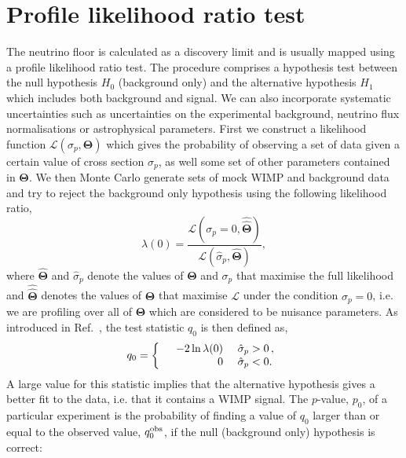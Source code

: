 \chapter{Profile likelihood ratio test}\label{app:likelihood}
The neutrino floor is calculated as a discovery limit and is usually mapped using a profile likelihood ratio test. The procedure comprises a hypothesis test between the null hypothesis $H_0$ (background only) and the alternative hypothesis $H_1$ which includes both background and signal. We can also incorporate systematic uncertainties such as uncertainties on the experimental background, neutrino flux normalisations or astrophysical parameters. First we construct a likelihood function $\mathscr{L}(\sigma_p,\boldsymbol{\Theta})$ which gives the probability of observing a set of data given a certain value of cross section $\sigma_p$, as well some set of other parameters contained in $\boldsymbol{\Theta}$. We then Monte Carlo generate sets of mock WIMP and background data and try to reject the background only hypothesis using the following likelihood ratio,
\begin{equation}
\lambda(0) = \frac{\mathscr{L}(\sigma_p = 0,\hat{\hat{\boldsymbol{\Theta}}})}{\mathscr{L}(\hat{\sigma}_p,\hat{\boldsymbol{\Theta}})},
\end{equation}
where ${\hat{\boldsymbol{\Theta}}}$ and $\hat{\sigma}_p$ denote the values of ${\boldsymbol{\Theta}}$ and $\sigma_p$ that maximise the full likelihood and  
$\hat{\hat{\boldsymbol{\Theta}}}$ denotes the values of ${\boldsymbol{\Theta}}$ that maximise $\mathscr{L}$ under the condition $\sigma_p = 0$, i.e. we are profiling over all of ${\boldsymbol{\Theta}}$ which are considered to be nuisance parameters. As introduced in Ref.~\cite{Cowan:2010js}, the test statistic $q_0$ is then defined as,
\begin{equation}
q_0 = \left\{
\begin{array}{rrll}
\rm & -2\ln\lambda(0)	&	\ \hat{\sigma}_p > 0 \,, \\
\rm & 0  		& 	\ \hat{\sigma}_p < 0. 
\end{array}\right.
\end{equation}
A large value for this statistic implies that the alternative hypothesis gives a better fit to the data,  i.e. that it contains a WIMP signal.
The $p$-value, $p_0$, of a particular experiment is the probability of finding a value of $q_0$ larger than or equal to the observed value, $q_0^{\rm obs}$, if the null (background only) hypothesis is correct:
